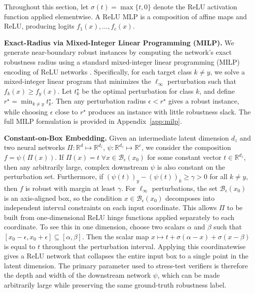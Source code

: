 \documentclass{article}
\theoremstyle{definition}
\begin{document}
Throughout this section, let $\sigma(t)=\max\{t,0\}$ denote the ReLU activation function applied elementwise. A ReLU MLP is a composition of affine maps and ReLU, producing logits $f_1(x),\dots,f_c(x)$. 

\textbf{Exact-Radius via Mixed-Integer Linear Programming (MILP).} 
We generate near-boundary robust instances by computing the network's exact robustness radius using a standard mixed-integer linear programming (MILP) encoding of ReLU networks \citep{DBLP:journals/corr/abs-1711-07356}. Specifically, for each target class $k\neq y$, we solve a mixed-integer linear program that minimizes the $\ell_\infty$ perturbation such that $f_k(x)\geq f_y(x)$. 
Let $t_k^\star$ be the optimal perturbation for class $k$, and define $r^\star=\min_{k\neq y}t_k^\star$. Then any perturbation radius $\epsilon<r^\star$ gives a robust instance, while choosing $\epsilon$ close to $r^\star$ produces an instance with little robustness slack. The full MILP formulation is provided in Appendix~\ref{app:milp}. 

\textbf{Constant-on-Box Embedding.} 
Given an intermediate latent dimension $d_z$ and two neural networks $\Pi: \mathbb{R}^d \mapsto \mathbb{R}^{d_z}$, $\psi : \mathbb{R}^{d_z} \mapsto \mathbb{R}^c$, we consider the composition %
$f = \psi(\Pi(x))$. 
If $\Pi(x)=t \; \forall x \in \mathcal{B}_\epsilon(x_0)$ for some constant vector $t\in\mathbb{R}^{d_z}$, then any arbitrarily large, complex downstream $\psi$ is also constant on the perturbation set. Furthermore, if $(\psi(t))_y - (\psi(t))_k\geq\gamma>0$ for all $k\neq y$, then $f$ is robust with margin at least $\gamma$. 
For $\ell_\infty$ perturbations, the set $\mathcal{B}_\epsilon(x_0)$ is an axis-aligned box, so the condition $x\in\mathcal{B}_\epsilon(x_0)$ decomposes into independent interval constraints on each input coordinate. This allows $\Pi$ to be built from one-dimensional ReLU hinge functions applied separately to each coordinate.
To see this in one dimension, choose two scalars $\alpha$ and $\beta$ such that $[x_0-\epsilon,x_0+\epsilon] \subseteq[\alpha,\beta]$. Then the scalar map $x \mapsto t+\sigma(\alpha-x)+\sigma(x-\beta)$ is equal to $t$ throughout the perturbation interval. Applying this coordinatewise gives a ReLU network that collapses the entire input box to a single point in the latent dimension. 
The primary parameter used to stress-test verifiers is therefore the depth and width of the downstream network $\psi$, which can be made arbitrarily large while preserving the same ground-truth robustness label. 
\end{document}
